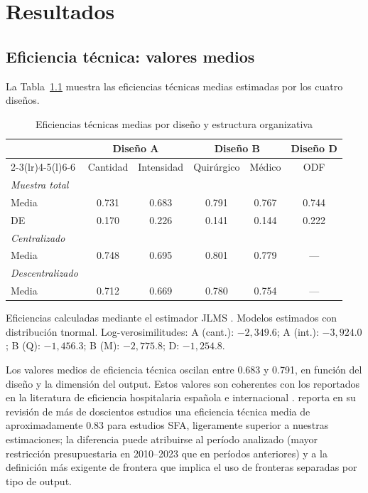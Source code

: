 ﻿\chapter{Resultados}
\label{ch:resultados}

\section{Eficiencia técnica: valores medios}

La Tabla~\ref{tab:te_medias} muestra las eficiencias técnicas medias estimadas por los cuatro diseños.

\begin{table}[htbp]
\centering
\caption{Eficiencias técnicas medias por diseño y estructura organizativa}
\label{tab:te_medias}
\begin{threeparttable}
\begin{tabular}{lccccc}
\toprule
& \multicolumn{2}{c}{\textbf{Diseño A}} &
  \multicolumn{2}{c}{\textbf{Diseño B}} &
  \textbf{Diseño D} \\
\cmidrule(lr){2-3}\cmidrule(lr){4-5}\cmidrule(l){6-6}
& Cantidad & Intensidad & Quirúrgico & Médico & ODF \\
\midrule
\textit{Muestra total} \\
\quad Media & 0.731 & 0.683 & 0.791 & 0.767 & 0.744 \\
\quad DE & 0.170 & 0.226 & 0.141 & 0.144 & 0.222 \\[4pt]
\textit{Centralizado} \\
\quad Media & 0.748 & 0.695 & 0.801 & 0.779 & --- \\[4pt]
\textit{Descentralizado} \\
\quad Media & 0.712 & 0.669 & 0.780 & 0.754 & --- \\
\bottomrule
\end{tabular}
\begin{tablenotes}
  \small
  \item Eficiencias calculadas mediante el estimador JLMS \citep{jondrow1982}. Modelos estimados con distribución tnormal. Log-verosimilitudes: A (cant.): $-2{,}349.6$; A (int.): $-3{,}924.0$; B (Q): $-1{,}456.3$; B (M): $-2{,}775.8$; D: $-1{,}254.8$.
\end{tablenotes}
\end{threeparttable}
\end{table}

Los valores medios de eficiencia técnica oscilan entre 0.683 y 0.791, en función del diseño y la dimensión del output. Estos valores son coherentes con los reportados en la literatura de eficiencia hospitalaria española \citep{puigjunoy2000} e internacional \citep{hollingsworth2008,rosko2008}. \citet{hollingsworth2008} reporta en su revisión de más de doscientos estudios una eficiencia técnica media de aproximadamente 0.83 para estudios SFA, ligeramente superior a nuestras estimaciones; la diferencia puede atribuirse al período analizado (mayor restricción presupuestaria en 2010--2023 que en períodos anteriores) y a la definición más exigente de frontera que implica el uso de fronteras separadas por tipo de output.

